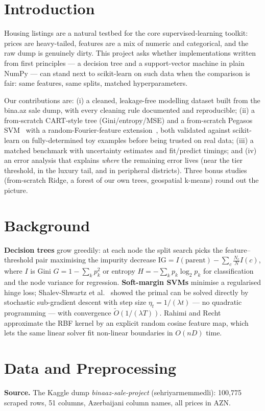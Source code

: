\documentclass[10pt,twocolumn,a4paper]{article}
\begin{document}
\section{Introduction}
Housing listings are a natural testbed for the core supervised-learning
toolkit: prices are heavy-tailed, features are a mix of numeric and
categorical, and the raw dump is genuinely dirty. This project asks
whether implementations written from first principles --- a decision tree
and a support-vector machine in plain NumPy --- can stand next to
scikit-learn on such data when the comparison is fair: same features, same
splits, matched hyperparameters.

Our contributions are: (i) a cleaned, leakage-free modelling dataset built
from the bina.az sale dump, with every cleaning rule documented and
reproducible; (ii) a from-scratch CART-style tree (Gini/entropy/MSE) and a
from-scratch Pegasos SVM~\cite{pegasos} with a random-Fourier-feature
extension~\cite{rff}, both validated against scikit-learn on
fully-determined toy examples before being trusted on real data; (iii) a
matched benchmark with uncertainty estimates and fit/predict timings; and
(iv) an error analysis that explains \emph{where} the remaining error
lives (near the tier threshold, in the luxury tail, and in peripheral
districts). Three bonus studies (from-scratch Ridge, a forest of our own
trees, geospatial k-means) round out the picture.

\section{Background}
\textbf{Decision trees} grow greedily: at each node the split search picks
the feature--threshold pair maximising the impurity decrease
$\mathrm{IG} = I(\text{parent}) - \sum_c \frac{N_c}{N} I(c)$, where $I$ is
Gini $G = 1 - \sum_k p_k^2$ or entropy $H = -\sum_k p_k \log_2 p_k$ for
classification and the node variance for regression. \textbf{Soft-margin
SVMs} minimise a regularised hinge loss; Shalev-Shwartz et
al.~\cite{pegasos} showed the primal can be solved directly by stochastic
sub-gradient descent with step size $\eta_t = 1/(\lambda t)$ --- no
quadratic programming --- with convergence $\tilde O(1/(\lambda T))$.
Rahimi and Recht~\cite{rff} approximate the RBF kernel by an explicit
random cosine feature map, which lets the same linear solver fit
non-linear boundaries in $O(nD)$ time.

\section{Data and Preprocessing}
\textbf{Source.} The Kaggle dump \emph{binaaz-sale-project}
(sehriyarmemmedli): 100{,}775 scraped rows, 51 columns, Azerbaijani
column names, all prices in AZN.
\end{document}
